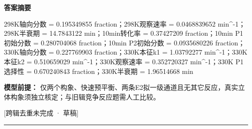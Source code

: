 \documentclass[UTF8,11pt,a4paper]{ctexart}
\begin{document}
\noindent\textbf{答案摘要}\par
298K轴向分数 = 0.195349855 fraction；298K观察速率 = 0.0468839652 min\textasciicircum{}-1；298K半衰期 = 14.7843122 min；10min转化率 = 0.37427209 fraction；10min P1初始分数 = 0.280704068 fraction；10min P2初始分数 = 0.0935680226 fraction；330K轴向分数 = 0.227769903 fraction；330K本征k1 = 1.03792277 min\textasciicircum{}-1；330K本征k2 = 0.510659029 min\textasciicircum{}-1；330K观察速率 = 0.352720327 min\textasciicircum{}-1；330K P1选择性 = 0.670240843 fraction；330K半衰期 = 1.96514668 min\par
\noindent\textbf{模型前提：}
仅两个构象、快速预平衡、两条E2拟一级通道且无其它反应，真实立体构象须独立核定；与旧辑竞争反应题需人工比较。\par
\noindent\textcolor{red!65!black}{[跨辑去重未完成 · 草稿]} \par
\medskip\hrule\medskip
{}
\end{document}
